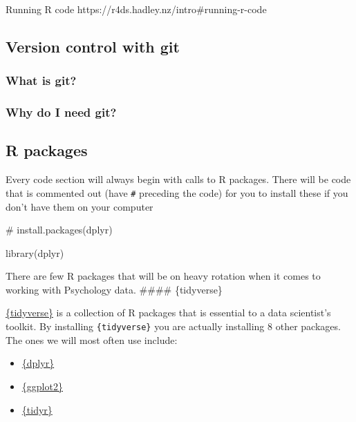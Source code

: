 \documentclass[
  letterpaper,
  DIV=11,
  numbers=noendperiod]{scrreprt}
\newenvironment{Shaded}{\begin{snugshade}}{\end{snugshade}}
\newcommand{\CommentTok}[1]{\textcolor[rgb]{0.37,0.37,0.37}{#1}}
\newcommand{\FunctionTok}[1]{\textcolor[rgb]{0.28,0.35,0.67}{#1}}
\newcommand{\NormalTok}[1]{\textcolor[rgb]{0.00,0.23,0.31}{#1}}
\providecommand{\tightlist}{%
  \setlength{\itemsep}{0pt}\setlength{\parskip}{0pt}}\usepackage{longtable,booktabs,array}
\begin{document}
Running R code https://r4ds.hadley.nz/intro\#running-r-code

\subsection{Version control with git}\label{version-control-with-git}

\subsubsection{What is git?}\label{what-is-git}

\subsubsection{Why do I need git?}\label{why-do-i-need-git}

\subsection{R packages}\label{r-packages}

Every code section will always begin with calls to R packages. There
will be code that is commented out (have \texttt{\#} preceding the code)
for you to install these if you don't have them on your computer

\begin{Shaded}
\begin{Highlighting}[]
\CommentTok{\# install.packages(dplyr)}

\FunctionTok{library}\NormalTok{(dplyr)}
\end{Highlighting}
\end{Shaded}

There are few R packages that will be on heavy rotation when it comes to
working with Psychology data. \#\#\#\# \{tidyverse\}

\href{https://www.tidyverse.org/}{\{tidyverse\}} is a collection of R
packages that is essential to a data scientist's toolkit. By installing
\texttt{\{tidyverse\}} you are actually installing 8 other packages. The
ones we will most often use include:

\begin{itemize}
\tightlist
\item
  \href{https://dplyr.tidyverse.org/}{\{dplyr\}}
\item
  \href{https://ggplot2.tidyverse.org/}{\{ggplot2\}}
\item
  \href{https://tidyr.tidyverse.org/}{\{tidyr\}}
\end{itemize}
\end{document}
